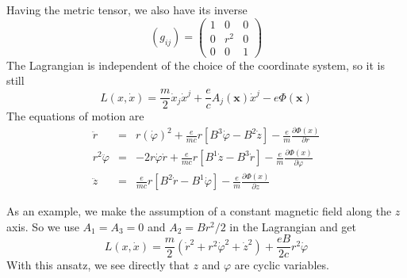 \documentclass[12pt]{report}
\begin{document}
Having the metric tensor, we also have its inverse
\begin{displaymath}
  (g_{ij})=\left(
    \begin{array}{ccc}
      1 & 0 & 0\\0 & r^2 & 0\\ 0 & 0 & 1
    \end{array}
  \right)
\end{displaymath}
The Lagrangian is independent of the choice of the coordinate system, so it is
still
\begin{displaymath}
  L(x,\dot x) =
  \frac{m}{2}\dot x_j\dot x^j
  +\frac{e}{c}A_j(\mathbf{x})\dot x^j
  -e\Phi(\mathbf{x})
\end{displaymath}
The equations of motion are 
\begin{eqnarray*}
  \ddot r
  &=& r(\dot \varphi)^2
  +\frac{e}{mc}r\left[
    B^3\dot \varphi
    -B^2\dot z
  \right]
  -\frac{e}{m}\frac{\partial \Phi(x)}{\partial r}\\
  r^2\ddot \varphi
  &=& -2r\dot \varphi\dot r
  +\frac{e}{mc}r\left[
    B^1\dot z
    -B^3\dot r
  \right]
  -\frac{e}{m}\frac{\partial \Phi(x)}{\partial \varphi}\\
  \ddot z
  &=&\frac{e}{mc}r\left[
    B^2\dot r
    -B^1\dot \varphi
  \right]
  -\frac{e}{m}\frac{\partial \Phi(x)}{\partial z}
\end{eqnarray*}

As an example, we make the assumption of a constant magnetic field
along the $z$ axis. So we use  $A_1=A_3=0$ and $A_2=Br^2/2$ in the
Lagrangian and get
\begin{displaymath}
  L(x,\dot x) =
  \frac{m}{2}(\dot r^2+r^2\dot\varphi^2+\dot z^2)
  +\frac{eB}{2c} r^2\dot \varphi
\end{displaymath}
With this ansatz, we see directly that $z$ and $\varphi$ are cyclic
variables. 
\end{document}
